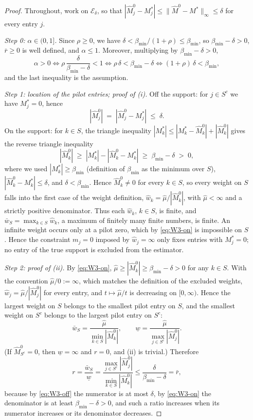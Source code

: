 \documentclass[11pt,a4paper]{article}
\numberwithin{equation}{section}
\theoremstyle{plain}
\theoremstyle{remark}
\begin{document}
\begin{proof}
Throughout, work on $\mathcal E_\delta$, so that
$|\hat M^0_j - M^*_j| \le \|\hat M^0 - M^*\|_\infty \le \delta$ for every entry $j$.

\emph{Step 0: $\alpha \in (0,1]$.}
Since $\rho \ge 0$, we have $\delta < \beta_{\min}/(1+\rho) \le \beta_{\min}$, so
$\beta_{\min} - \delta > 0$, $\bar r \ge 0$ is well defined, and $\alpha \le 1$. Moreover,
multiplying by $\beta_{\min} - \delta > 0$,
\[
  \alpha > 0
  \iff \rho\,\frac{\delta}{\beta_{\min}-\delta} < 1
  \iff \rho\,\delta < \beta_{\min} - \delta
  \iff (1+\rho)\,\delta < \beta_{\min},
\]
and the last inequality is the assumption.

\emph{Step 1: location of the pilot entries; proof of (i).}
Off the support: for $j \in S^c$ we have $M^*_j = 0$, hence
\begin{equation}\label{eq:W3-off}
  |\hat M^0_j| \;=\; |\hat M^0_j - M^*_j| \;\le\; \delta .
\end{equation}
On the support: for $k \in S$, the triangle inequality
$|M^*_k| \le |M^*_k - \hat M^0_k| + |\hat M^0_k|$ gives the reverse triangle inequality
\begin{equation}\label{eq:W3-on}
  |\hat M^0_k| \;\ge\; |M^*_k| - |\hat M^0_k - M^*_k| \;\ge\; \beta_{\min} - \delta \;>\; 0,
\end{equation}
where we used $|M^*_k| \ge \beta_{\min}$ (definition of $\beta_{\min}$ as the minimum over $S$),
$|\hat M^0_k - M^*_k| \le \delta$, and $\delta < \beta_{\min}$.
Hence $\hat M^0_k \neq 0$ for every $k \in S$, so every weight on $S$ falls into the first case
of the weight definition, $\hat w_k = \hat\mu / |\hat M^0_k|$, with $\hat\mu < \infty$ and a
strictly positive denominator. Thus each $\hat w_k$, $k \in S$, is finite, and
$\bar w_S = \max_{k \in S} \hat w_k$, a maximum of finitely many finite numbers, is finite.
An infinite weight occurs only at a pilot zero, which by \eqref{eq:W3-on} is impossible on $S$.
Hence the constraint $m_j = 0$ imposed by $\hat w_j = \infty$ only fixes entries with
$M^*_j = 0$; no entry of the true support is excluded from the estimator.

\emph{Step 2: proof of (ii).}
By \eqref{eq:W3-on}, $\hat\mu \ge |\hat M^0_k| \ge \beta_{\min} - \delta > 0$ for any $k \in S$.
With the convention $\hat\mu/0 := \infty$, which matches the definition of the excluded weights,
$\hat w_j = \hat\mu / |\hat M^0_j|$ for every entry, and $t \mapsto \hat\mu/t$ is decreasing on
$[0,\infty)$. Hence the largest weight on $S$ belongs to the smallest pilot entry on $S$, and
the smallest weight on $S^c$ belongs to the largest pilot entry on $S^c$:
\[
  \bar w_S = \frac{\hat\mu}{\min_{k\in S}|\hat M^0_k|},
  \qquad
  \underline w = \frac{\hat\mu}{\max_{j\in S^c}|\hat M^0_j|}.
\]
(If $\hat M^0_{S^c} = 0$, then $\underline w = \infty$ and $r = 0$, and (ii) is trivial.)
Therefore
\[
  r = \frac{\bar w_S}{\underline w}
    = \frac{\max_{j\in S^c}|\hat M^0_j|}{\min_{k\in S}|\hat M^0_k|}
    \le \frac{\delta}{\beta_{\min} - \delta} = \bar r,
\]
because by \eqref{eq:W3-off} the numerator is at most $\delta$, by \eqref{eq:W3-on} the
denominator is at least $\beta_{\min} - \delta > 0$, and such a ratio increases when its
numerator increases or its denominator decreases.


\end{proof}
\end{document}
